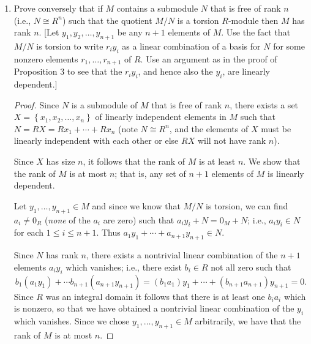 \documentclass[11pt]{article}
\newcommand{\cbr}[1]{\left\{#1\right\}}
\begin{document}
\begin{enumerate}
\begin{enumerate}[label=\textbf{(\alph*)}]
\begin{proof}
            It follows that $-r(y + N) = -ry + N = (r_1x_1 + \cdots r_nx_n) + N = 0 + N$ in the quotient $M/N$. Since $y$ was arbitrary in $M$, it follows that $M/N$ is a torsion $R$-module.
        \end{proof}
        \item Prove conversely that if $M$ contains a submodule $N$ that is free of rank $n$ (i.e., $N\cong R^n$) such that the quotient $M/N$ is a torsion $R$-module then $M$ has rank $n$. [Let $y_1,y_2,\dots,y_{n+1}$ be any $n+1$ elements of $M$. Use the fact that $M/N$ is torsion to write $r_iy_i$ as a linear combination of a basis for $N$ for some nonzero elements $r_1,\dots,r_{n+1}$ of $R$. Use an argument as in the proof of Proposition 3 to see that the $r_iy_i$, and hence also the $y_i$, are linearly dependent.] \begin{proof}
            Since $N$ is a submodule of $M$ that is free of rank $n$, there exists a set $X = \cbr{x_1,x_2,\dots,x_n}$ of linearly independent elements in $M$ such that $N = RX = Rx_1 + \cdots + Rx_n$ (note $N\cong R^n$, and the elements of $X$ must be linearly independent with each other or else $RX$ will not have rank $n$).
            
            Since $X$ has size $n$, it follows that the rank of $M$ is at least $n$. We show that the rank of $M$ is at most $n$; that is, any set of $n+1$ elements of $M$ is linearly dependent.

            Let $y_1,\dots,y_{n+1}\in M$ and since we know that $M/N$ is torsion, we can find $a_i\neq 0_R$ (\textit{none} of the $a_i$ are zero) such that $a_iy_i + N = 0_M + N$; i.e., $a_iy_i\in N$ for each $1\leq i \leq n+1$. Thus $a_1y_1 + \cdots + a_{n+1}y_{n+1}\in N$. 

            Since $N$ has rank $n$, there exists a nontrivial linear combination of the $n+1$ elements $a_iy_i$ which vanishes; i.e., there exist $b_i\in R$ not all zero such that \[b_1(a_1y_1) + \cdots b_{n+1}(a_{n+1}y_{n+1}) = (b_1a_1)y_1 + \cdots + (b_{n+1}a_{n+1})y_{n+1} = 0.\] Since $R$ was an integral domain it follows that there is at least one $b_ia_i$ which is nonzero, so that we have obtained a nontrivial linear combination of the $y_i$ which vanishes. Since we chose $y_1,\dots,y_{n+1}\in M$ arbitrarily, we have that the rank of $M$ is at most $n$.


\end{proof}
\end{enumerate}
\end{enumerate}
\end{document}
